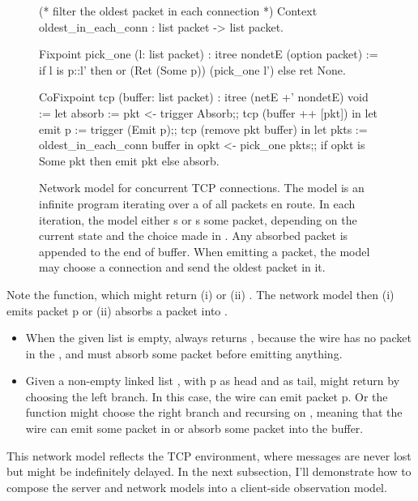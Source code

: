 \begin{figure}
\begin{coq}
(* filter the oldest packet in each connection *)
Context oldest_in_each_conn : list packet -> list packet.

Fixpoint pick_one (l: list packet) : itree nondetE (option packet) :=%
  if l is p::l'
  then or (Ret (Some p)) (pick_one l')
  else ret None.

CoFixpoint tcp (buffer: list packet) : itree (netE +' nondetE) void :=
  let absorb := pkt <- trigger Absorb;;
                tcp (buffer ++ [pkt])      in
  let emit p := trigger (Emit p);;
                tcp (remove pkt buffer)    in
  let pkts   := oldest_in_each_conn buffer in
  opkt <- pick_one pkts;;
  if opkt is Some pkt
  then emit pkt
  else absorb.
\end{coq}
\caption[Network model for concurrent TCP connections]{Network model for
  concurrent TCP connections.  The model is an infinite program iterating over a
   of all packets en route.  In each iteration, the model either
  s or s some packet, depending on the current
   state and the choice made in .  Any absorbed packet
  is appended to the end of buffer.  When emitting a packet, the model may
  choose a connection and send the oldest packet in it.}
\label{fig:tcp-model}
\end{figure}

Note the  function, which might return (i)  or (ii)
.  The network model then (i) emits packet \ilc p or (ii) absorbs a
packet into .

\begin{itemize}
\item When the given list  is empty,  always returns
  , because the wire has no packet in the , and must
  absorb some packet before emitting anything.
\item Given a non-empty linked list , with \ilc p as head and
   as tail,  might return  by choosing the
  left branch.  In this case, the wire can emit packet \ilc p.  Or the function
  might choose the right branch and recursing on , meaning that the wire
  can emit some packet in  or absorb some packet into the buffer.
\end{itemize}

This network model reflects the TCP environment, where messages are never lost
but might be indefinitely delayed.  In the next subsection, I'll demonstrate how
to compose the server and network models into a client-side observation model.

